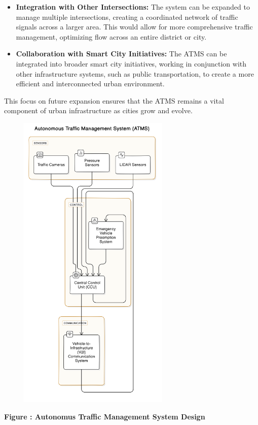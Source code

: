 \documentclass{scrreprt}
\begin{document}
\begin{itemize}
    \item \textbf{Integration with Other Intersections:} 
    The system can be expanded to manage multiple intersections, creating a coordinated network of traffic signals across a larger area. This would allow for more comprehensive traffic management, optimizing flow across an entire district or city.

    \item \textbf{Collaboration with Smart City Initiatives:} 
    The ATMS can be integrated into broader smart city initiatives, working in conjunction with other infrastructure systems, such as public transportation, to create a more efficient and interconnected urban environment.
\end{itemize}

This focus on future expansion ensures that the ATMS remains a vital component of urban infrastructure as cities grow and evolve.


\begin{center}
    {\includegraphics[width=350px, height=550px]{e.png}}
    \parbox{0.8\textwidth}{ 
        \centering
        \textbf{Figure : Autonomus Traffic Management System Design}
    }
\end{center}
\end{document}
